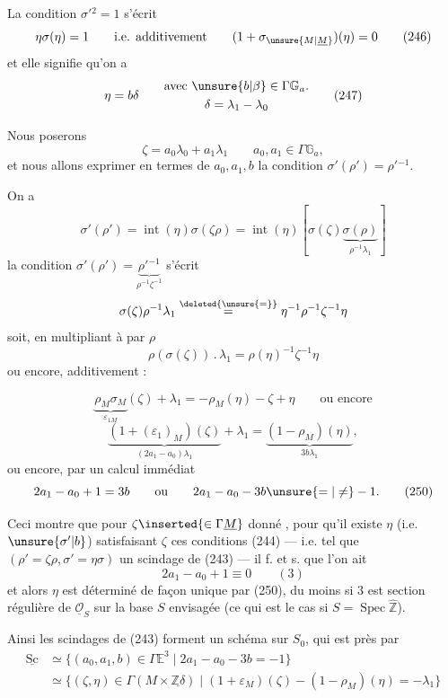 La condition $\sigma'{}^2=1$ s'écrit
\[
\eta\sigma(\eta)=1
\qquad\text{i.e. additivement}\qquad
(1+\sigma_{\unsure{M|\underline M}})(\eta)=0
\tag{246}
\]
et elle signifie qu'on a
\[
\eta=b\delta\qquad
\begin{gathered}
\text{avec }\unsure{b|\beta}\in\Gamma\mathbb G_a.\\
\delta=\lambda_1-\lambda_0
\end{gathered}
\tag{247}
\]

Nous poserons
\[
\zeta=a_0\lambda_0+a_1\lambda_1
\qquad a_0,a_1\in\Gamma\mathbb G_a,
\tag{248}
\]
et nous allons exprimer en termes de $a_0,a_1,b$ la condition
$\sigma'(\rho')=\rho'{}^{-1}$.

On a
\[
\sigma'(\rho')=\operatorname{int}(\eta)\sigma(\zeta\rho)
=\operatorname{int}(\eta)
\left[\sigma(\zeta)\underbrace{\sigma(\rho)}_{\rho^{-1}\lambda_1}\right]
\]
la condition
$\sigma'(\rho')=\underbrace{\rho'{}^{-1}}_{\rho^{-1}\zeta^{-1}}$
s'écrit
\[
\sigma(\zeta)\rho^{-1}\lambda_1
\overset{\deleted{\unsure{=}}}{=}
\eta^{-1}\rho^{-1}\zeta^{-1}\eta
\]
soit, en multipliant à  par $\rho$
\[
\rho(\sigma(\zeta))\mathbin{.}\lambda_1
=\rho(\eta)^{-1}\zeta^{-1}\eta
\]
ou encore, additivement :



\[
\underbrace{\rho_M\sigma_M}_{\varepsilon_{1M}}(\zeta)+\lambda_1
=-\rho_M(\eta)-\zeta+\eta
\qquad\text{ou encore}
\]
\[
\underbrace{(1+(\varepsilon_1)_M)(\zeta)}_{(2a_1-a_0)\lambda_1}
+\lambda_1
=\underbrace{(1-\rho_M)(\eta)}_{3b\lambda_1},
\tag{249}
\]
ou encore, par un calcul immédiat
\[
2a_1-a_0+1=3b
\qquad\text{ou}\qquad
2a_1-a_0-3b\unsure{=|\ne}-1.
\tag{250}
\]

Ceci montre que pour $\zeta\inserted{\in\Gamma\underline M}$ donné
, pour qu'il existe $\eta$
(i.e. $\unsure{\sigma'|b}$) satisfaisant  $\zeta$ ces
conditions (244) --- i.e.  tel que
$(\rho'=\zeta\rho,\sigma'=\eta\sigma)$  un scindage de
(243) --- il f. et s. que l'on ait
\[
2a_1-a_0+1\equiv0\qquad(3)
\tag{251}
\]
et alors $\eta$ est déterminé de façon unique par (250), du moins si $3$ est
section régulière de $\underline{\mathcal O}_S$ sur la base $S$
envisagée (ce qui est le cas si $S=\operatorname{Spec}\widehat{\mathbb Z}$).

Ainsi les scindages de (243) forment un schéma
 sur $S_0$, qui est
  près par
\[
\begin{aligned}
\underline{\mathrm{Sc}}
&\simeq
\{(a_0,a_1,b)\in\Gamma\mathbb E^3
  \mid 2a_1-a_0-3b=-1\}\\
&\simeq
\{(\zeta,\eta)\in\Gamma(M\times\underline{\mathbb Z\delta})
  \mid(1+\varepsilon_{M})(\zeta)
       -(1-\rho_M)(\eta)=-\lambda_1\}
\end{aligned}
\tag{252}
\]

